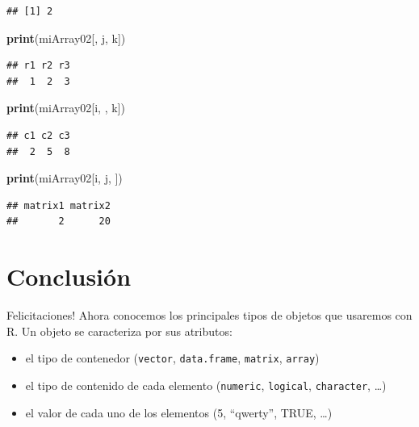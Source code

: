 \documentclass[]{book}
\newenvironment{Shaded}{\begin{snugshade}}{\end{snugshade}}
\newcommand{\KeywordTok}[1]{\textcolor[rgb]{0.13,0.29,0.53}{\textbf{#1}}}
\newcommand{\NormalTok}[1]{#1}
\providecommand{\tightlist}{%
  \setlength{\itemsep}{0pt}\setlength{\parskip}{0pt}}
\begin{document}
\begin{verbatim}
## [1] 2
\end{verbatim}

\begin{Shaded}
\begin{Highlighting}[]
\KeywordTok{print}\NormalTok{(miArray02[, j, k])}
\end{Highlighting}
\end{Shaded}

\begin{verbatim}
## r1 r2 r3 
##  1  2  3
\end{verbatim}

\begin{Shaded}
\begin{Highlighting}[]
\KeywordTok{print}\NormalTok{(miArray02[i, , k])}
\end{Highlighting}
\end{Shaded}

\begin{verbatim}
## c1 c2 c3 
##  2  5  8
\end{verbatim}

\begin{Shaded}
\begin{Highlighting}[]
\KeywordTok{print}\NormalTok{(miArray02[i, j, ])}
\end{Highlighting}
\end{Shaded}

\begin{verbatim}
## matrix1 matrix2 
##       2      20
\end{verbatim}

\section{Conclusión}\label{conclusion-3}

Felicitaciones! Ahora conocemos los principales tipos de objetos que
usaremos con R. Un objeto se caracteriza por sus atributos:

\begin{itemize}
\tightlist
\item
  el tipo de contenedor (\texttt{vector}, \texttt{data.frame},
  \texttt{matrix}, \texttt{array})
\item
  el tipo de contenido de cada elemento (\texttt{numeric},
  \texttt{logical}, \texttt{character}, \ldots{})
\item
  el valor de cada uno de los elementos (5, ``qwerty'', TRUE, \ldots{})
\end{itemize}
\end{document}
